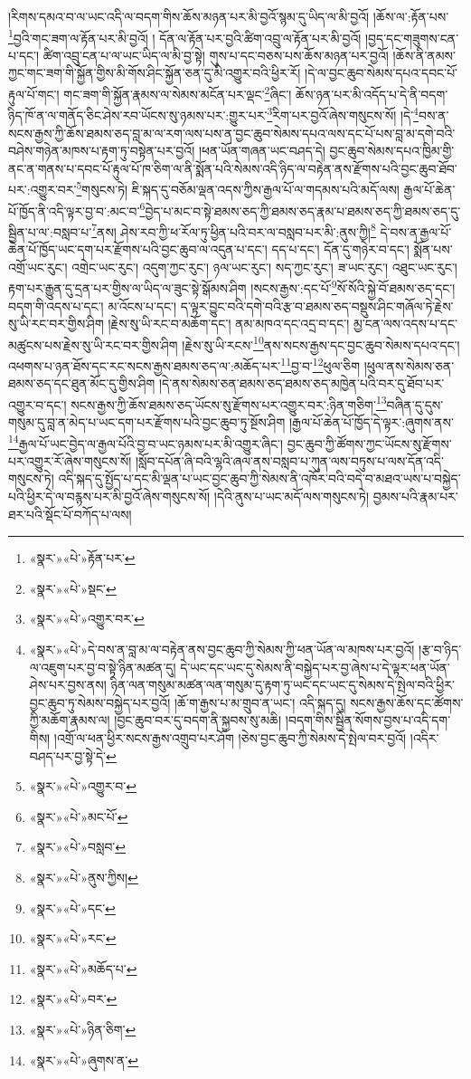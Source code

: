 །རིགས་དམའ་བ་ལ་ཡང་འདི་ལ་བདག་གིས་ཆོས་མཉན་པར་མི་བྱའོ་སྙམ་དུ་ཡིད་ལ་མི་བྱའོ། །ཆོས་ལ་:རྟོན་པས་\footnote{«སྣར་»«པེ་»རྟོན་པར་}བྱའི་གང་ཟག་ལ་རྟོན་པར་མི་བྱའོ། །
དོན་ལ་རྟོན་པར་བྱའི་ཚིག་འབྲུ་ལ་རྟོན་པར་མི་བྱའོ། །བྱད་དང་གཟུགས་ངན་པ་དང་། ཚིག་འབྲུ་ངན་པ་ལ་ཡང་ཡིད་ལ་མི་བྱ་སྟེ། གུས་པ་དང་བཅས་པས་ཆོས་མཉན་པར་བྱའོ། །ཆོས་ནི་ནམས་ཀྱང་གང་ཟག་གི་སྐྱོན་གྱིས་མི་གོས་ཤིང་སྐྱོན་ཅན་དུ་མི་འགྱུར་བའི་ཕྱིར་རོ། །དེ་ལ་བྱང་ཆུབ་སེམས་དཔའ་དབང་པོ་རྟུལ་པོ་གང་། གང་ཟག་གི་སྐྱོན་རྣམས་ལ་སེམས་མངོན་པར་ལྡང་\footnote{«སྣར་»«པེ་»སྡང་}ཞིང་། ཆོས་ཉན་པར་མི་འདོད་པ་དེ་ནི་བདག་ཉིད་ཁོ་ན་ལ་གནོད་ཅིང་ཤེས་རབ་ཡོངས་སུ་ཉམས་པར་:གྱུར་པར་\footnote{«སྣར་»«པེ་»འགྱུར་བར་}རིག་པར་བྱའོ་ཞེས་གསུངས་སོ། །དེ་\footnote{«སྣར་»«པེ་»དེ་བས་ན་བླ་མ་ལ་བརྟེན་ནས་བྱང་ཆུབ་ཀྱི་སེམས་ཀྱི་ཕན་ཡོན་ལ་མཁས་པར་བྱའོ། །རྩ་བ་ཉིད་ལ་འཇུག་པར་བྱ་བ་སྟེ་ཉིན་མཚན་དུ། དེ་ཡང་དང་ཡང་དུ་སེམས་ནི་བསྐྱེད་པར་བྱ་ཞེས་པ་དེ་ལྟར་ཕན་ཡོན་ཤེས་པར་བྱས་ནས། ཉིན་ལན་གསུམ་མཚན་ལན་གསུམ་དུ་རྟག་ཏུ་ཡང་དང་ཡང་དུ་སེམས་དེ་སྤེལ་བའི་ཕྱིར་བྱང་ཆུབ་ཏུ་སེམས་བསྐྱེད་པར་བྱའོ། །ཆོ་ག་རྒྱས་པ་མ་གྲུབ་ན་ཡང་། འདི་སྐད་དུ། སངས་རྒྱས་ཆོས་དང་ཚོགས་ཀྱི་མཆོག་རྣམས་ལ། །བྱང་ཆུབ་བར་དུ་བདག་ནི་སྐྱབས་སུ་མཆི། །བདག་གིས་སྦྱིན་སོགས་བྱས་པ་འདི་དག་གིས། །འགྲོ་ལ་ཕན་ཕྱིར་སངས་རྒྱས་འགྲུབ་པར་ཤོག །ཅེས་བྱང་ཆུབ་ཀྱི་སེམས་དེ་སྤེལ་བར་བྱའོ། །འདིར་བཤད་པར་བྱ་སྟེ་དེ་}བས་ན་སངས་རྒྱས་ཀྱི་ཆོས་ཐམས་ཅད་བླ་མ་ལ་རག་ལས་པས་ན་བྱང་ཆུབ་སེམས་དཔའ་ལས་དང་པོ་པས་བླ་མ་དགེ་བའི་བཤེས་གཉེན་མཁས་པ་རྟག་ཏུ་བསྟེན་པར་བྱའོ། །ཕན་ཡོན་གཞན་ཡང་བཤད་དེ། བྱང་ཆུབ་སེམས་དཔའ་ཁྱིམ་གྱི་ནང་ན་གནས་པ་དབང་པོ་རྟུལ་པོ་ཁ་ཅིག་ལ་ནི་སྨོན་པའི་སེམས་འདི་ཉིད་ལ་བརྟེན་ནས་རྫོགས་པའི་བྱང་ཆུབ་ཐོབ་པར་:འགྱུར་བར་\footnote{«སྣར་»«པེ་»འགྱུར་བ་}གསུངས་ཏེ། ཇི་སྐད་དུ་བཅོམ་ལྡན་འདས་ཀྱིས་རྒྱལ་པོ་ལ་གདམས་པའི་མདོ་ལས། རྒྱལ་པོ་ཆེན་པོ་ཁྱོད་ནི་འདི་ལྟར་བྱ་བ་:མང་བ་\footnote{«སྣར་»«པེ་»མང་པོ་}བྱེད་པ་མང་བ་སྟེ་ཐམས་ཅད་ཀྱི་ཐམས་ཅད་རྣམ་པ་ཐམས་ཅད་ཀྱི་ཐམས་ཅད་དུ་སྦྱིན་པ་ལ་:བསླབ་པ་\footnote{«སྣར་»«པེ་»བསླབ་}ནས། ཤེས་རབ་ཀྱི་ཕ་རོལ་ཏུ་ཕྱིན་པའི་བར་ལ་བསླབ་པར་མི་:ནུས་ཀྱི།\footnote{«སྣར་»«པེ་»ནུས་ཀྱིས།} དེ་བས་ན་རྒྱལ་པོ་ཆེན་པོ་ཁྱོད་ཡང་དག་པར་རྫོགས་པའི་བྱང་ཆུབ་ལ་འདུན་པ་དང་། དད་པ་དང་། དོན་དུ་གཉེར་བ་དང་། སྨོན་པས་འགྲོ་ཡང་རུང་། འགྲེང་ཡང་རུང་། འདུག་ཀྱང་རུང་། ཉལ་ཡང་རུང་། སད་ཀྱང་རུང་། ཟ་ཡང་རུང་། འཐུང་ཡང་རུང་། རྟག་པར་རྒྱུན་དུ་དྲན་པར་གྱིས་ལ་ཡིད་ལ་ཟུང་སྟེ་སྒོམས་ཤིག །སངས་རྒྱས་:དང་པོ་\footnote{«སྣར་»«པེ་»དང་}སོ་སོའི་སྐྱེ་བོ་ཐམས་ཅད་དང་། བདག་གི་འདས་པ་དང་། མ་འོངས་པ་དང་། ད་ལྟར་བྱུང་བའི་དགེ་བའི་རྩ་བ་ཐམས་ཅད་བསྡུས་ཤིང་གཞོལ་ཏེ་རྗེས་སུ་ཡི་རང་བར་གྱིས་ཤིག །རྗེས་སུ་ཡི་རང་བ་མཆོག་དང་། ནམ་མཁའ་དང་འདྲ་བ་དང་། མྱ་ངན་ལས་འདས་པ་དང་མཚུངས་པས་རྗེས་སུ་ཡི་རང་བར་གྱིས་ཤིག །རྗེས་སུ་ཡི་རངས་\footnote{«སྣར་»«པེ་»རང་}ནས་སངས་རྒྱས་དང་བྱང་ཆུབ་སེམས་དཔའ་དང་། འཕགས་པ་ཉན་ཐོས་དང་རང་སངས་རྒྱས་ཐམས་ཅད་ལ་:མཆོད་པར་\footnote{«སྣར་»«པེ་»མཆོད་པ་}བྱ་བ་\footnote{«སྣར་»«པེ་»བར་}ཕུལ་ཅིག །ཕུལ་ནས་སེམས་ཅན་ཐམས་ཅད་དང་ཐུན་མོང་དུ་གྱིས་ཤིག །དེ་ནས་སེམས་ཅན་ཐམས་ཅད་ཐམས་ཅད་མཁྱེན་པའི་བར་དུ་ཐོབ་པར་འགྱུར་བ་དང་། སངས་རྒྱས་ཀྱི་ཆོས་ཐམས་ཅད་ཡོངས་སུ་རྫོགས་པར་འགྱུར་བར་:ཉིན་གཅིག་\footnote{«སྣར་»«པེ་»ཉིན་ཅིག་}བཞིན་དུ་དུས་གསུམ་དུ་བླ་ན་མེད་པ་ཡང་དག་པར་རྫོགས་པའི་བྱང་ཆུབ་ཏུ་སྔོས་ཤིག །རྒྱལ་པོ་ཆེན་པོ་ཁྱོད་དེ་ལྟར་:ཞུགས་ནས་\footnote{«སྣར་»«པེ་»ཞུགས་ན་}རྒྱལ་པོ་ཡང་བྱེད་ལ་རྒྱལ་པོའི་བྱ་བ་ཡང་ཉམས་པར་མི་འགྱུར་ཞིང་། བྱང་ཆུབ་ཀྱི་ཚོགས་ཀྱང་ཡོངས་སུ་རྫོགས་པར་འགྱུར་རོ་ཞེས་གསུངས་སོ། །སློབ་དཔོན་ཞི་བའི་ལྷའི་ཞལ་ནས་བསླབ་པ་ཀུན་ལས་བཏུས་པ་ལས་དོན་འདི་གསུངས་ཏེ། འདི་སྐད་དུ་སྤྱོད་པ་དང་མི་ལྡན་པ་ཡང་བྱང་ཆུབ་ཀྱི་སེམས་ནི་འཁོར་བའི་བདེ་བ་མཐའ་ཡས་པ་བསྐྱེད་པའི་ཕྱིར་དེ་ལ་བརྙས་པར་མི་བྱའོ་ཞེས་གསུངས་སོ། །དེའི་ནུས་པ་ཡང་མདོ་ལས་གསུངས་ཏེ། བྱམས་པའི་རྣམ་པར་ཐར་པའི་སྡོང་པོ་བཀོད་པ་ལས། 